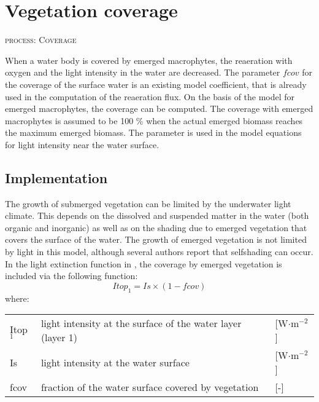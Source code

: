 \section{Vegetation coverage}
\begin{flushright}
\textsc{process: Coverage}
\end{flushright}

When a water body is covered by emerged macrophytes, the reaeration with oxygen and the light intensity in the water are decreased.
The parameter $fcov$ for the coverage of the surface water is an existing model coefficient, that is already used in the computation of the reaeration flux.
On the basis of the model for emerged macrophytes, the coverage can be computed.
The coverage with emerged macrophytes is assumed to be 100 \% when the actual emerged biomass reaches the maximum emerged biomass.
The parameter is used in the model equations for light intensity near the water surface.

\subsection{Implementation}

The growth of submerged vegetation can be limited by the underwater light climate. This depends on the dissolved
and suspended matter in the water (both organic and inorganic)
\cite{VanDuinEtAl2001} as well as on the shading due to emerged vegetation that covers the surface of
the water. The growth of emerged vegetation is not limited by light in this model, although several authors
report that selfshading can occur. In the light extinction function in \DWAQ, the coverage by emerged
vegetation is included via the following function:
%
\begin{equation}
Itop_1 = Is \times (1 - fcov)
\end{equation}
%
where:

\begin{tabular}{lll}
Itop$_1$   & light intensity at the surface of the water layer (layer 1)   & [W$\cdot$m$^{-2}$] \\
Is         & light intensity at the water surface                          & [W$\cdot$m$^{-2}$] \\
fcov       & fraction of the water surface covered by vegetation           & [-]                \\
\end{tabular}

